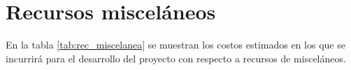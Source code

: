 \section{Recursos misceláneos}
En la tabla \ref{tab:rec_miscelanea} se muestran los costos estimados en los que se incurrirá para el desarrollo del proyecto con respecto a recursos de misceláneos.
  \begin{table}[!htb]
    \caption{Recursos misceláneos}
    \label{tab:rec_miscelanea}
    \begin{center}
    \end{center}
  \end{table}

